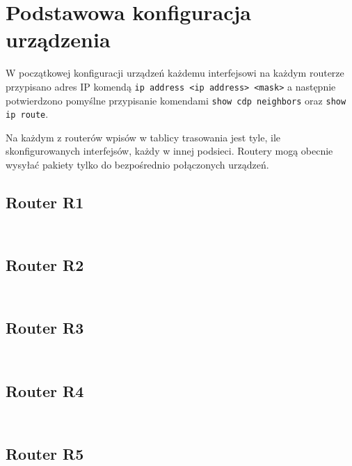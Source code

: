 \documentclass[a4paper,12pt,notitlepage]{article}
\begin{document}
\section{Podstawowa konfiguracja urządzenia}

W początkowej konfiguracji urządzeń każdemu interfejsowi na każdym routerze przypisano adres IP komendą \texttt{ip address <ip address> <mask>} a następnie potwierdzono pomyślne przypisanie komendami \texttt{show cdp neighbors} oraz \texttt{show ip route}.

Na każdym z routerów wpisów w tablicy trasowania jest tyle, ile skonfigurowanych interfejsów, każdy w innej podsieci. Routery mogą obecnie wysyłać pakiety tylko do bezpośrednio połączonych urządzeń.

\subsection*{Router R1}
\inputminted[label=\#show cdp neighbors, firstline=156, lastline=157]{text}{R1.txt}%
\vspace{-1cm}%
\inputminted[label=\#show ip route, firstline=167, lastline=170]{text}{R1.txt}

\subsection*{Router R2}
\inputminted[label=\#show cdp neighbors, firstline=297, lastline=300]{text}{R2_1.txt}%
\vspace{-1cm}%
\inputminted[label=\#show ip route, firstline=310, lastline=316]{text}{R2_1.txt}

\subsection*{Router R3}
\inputminted[label=\#show cdp neighbors, firstline=215, lastline=218]{text}{R3.txt}%
\vspace{-1cm}%
\inputminted[label=\#show ip route, firstline=203, lastline=208]{text}{R3.txt}

\subsection*{Router R4}
\inputminted[label=\#show cdp neighbors, firstline=203, lastline=206]{text}{R4.txt}%
\vspace{-1cm}%
\inputminted[label=\#show ip route, firstline=173, lastline=178]{text}{R4.txt}

\subsection*{Router R5}
\inputminted[label=\#show cdp neighbors, firstline=221, lastline=223]{text}{R5.txt}%
\vspace{-1cm}%
\inputminted[label=\#show ip route, firstline=232, lastline=237]{text}{R5.txt}
\end{document}
